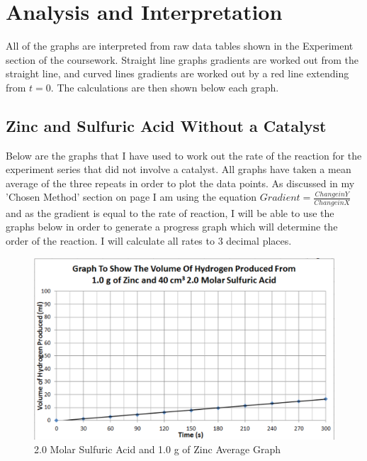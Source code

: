 \chapter {Analysis and Interpretation} %

All of the graphs are interpreted from raw data tables shown in the Experiment section of the coursework. Straight line graphs gradients are worked out from the straight line, and curved lines gradients are worked out by a red line extending from $t = 0$. The calculations are then shown below each graph.

\section{Zinc and Sulfuric Acid Without a Catalyst}

Below are the graphs that I have used to work out the rate of the reaction for the experiment series that did not involve a catalyst. All graphs have taken a mean average of the three repeats in order to plot the data points. As discussed in my 'Chosen Method' section on page \pageref{Chosen Method} I am using the equation $Gradient = \frac{Change in Y}{Change in X}$ and as the gradient is equal to the rate of reaction, I will be able to use the graphs below in order to generate a progress graph which will determine the order of the reaction. I will calculate all rates to 3 decimal places.

\begin{figure}[H]
    \includegraphics[width=\textwidth]{./Analysis/Images/1NonCatalyst/2Molar.pdf}
    \caption{2.0 Molar Sulfuric Acid and 1.0 g of Zinc Average Graph} \label{fig:2MolarSAGradient}
\end{figure}

